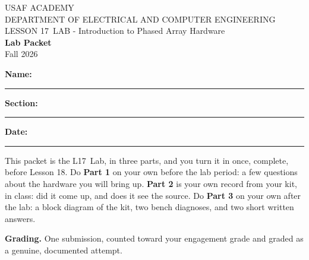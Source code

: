 \documentclass{exam}
\def\labLesson{17}
\def\thisterm{\thisTermIn}
\def\thisterm{Fall 2026}
\begin{document}
\pagestyle{headandfoot}   %


\begin{center}
USAF ACADEMY \\
DEPARTMENT OF ELECTRICAL AND COMPUTER ENGINEERING \\
LESSON \labLesson\ LAB - Introduction to Phased Array Hardware \\
\textbf{Lab Packet} \\
\thisterm \\[4mm]
\end{center}

\vspace{-4pt}
\textbf{Name:} \rule[-2pt]{2.6in}{0.4pt} \hfill
\textbf{Section:} \rule[-2pt]{0.9in}{0.4pt} \hfill
\textbf{Date:} \rule[-2pt]{1.1in}{0.4pt}

\vspace{4pt}


\vspace{2pt}

This packet is the L\labLesson\ Lab, in three parts, and you turn it in once, complete,
before Lesson 18. Do \textbf{Part 1} on your own before the lab period: a few
questions about the hardware you will bring up. \textbf{Part 2} is your own
record from your kit, in class: did it come up, and does it see the
source. Do
\textbf{Part 3} on your own after the lab: a block diagram of the kit, two
bench diagnoses, and two short written answers.

\textbf{Grading.} One submission, counted toward your engagement grade and
graded as a genuine, documented attempt.
\end{document}
